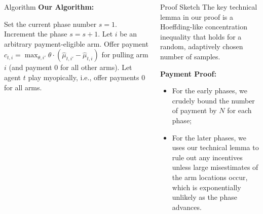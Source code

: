 \documentclass[final]{beamer} %
\begin{document}
\begin{frame}[t]
\begin{columns}[t]
\begin{column}{0.28\paperwidth}
\begin{block}{Algorithm}
\vspace{0.5cm}
\textbf{Our Algorithm:}
\vspace{0.5cm}

\begin{algorithmic}
\STATE Set the current phase number $s = 1$.
 {
\STATE Increment the phase $s = s + 1$.
\ENDIF
{} 
    \STATE Let $i$ be an arbitrary payment-eligible arm.
    \STATE Offer payment $c_{t,i} = \max_{\theta,i'} \theta \cdot (\hat{\mu}_{t,i'} - \hat{\mu}_{t,i})$ for pulling arm $i$ (and payment 0 for all other arms).
\ELSE
    \STATE Let agent $t$ play myopically, i.e., offer payments 0 for all arms.
\ENDIF 
}\ENDFOR
\end{algorithmic}

\end{block}


\end{column}



\begin{column}{0.28\paperwidth}


\begin{block}{Proof Sketch}
The key technical lemma in our proof is a Hoeffding-like concentration inequality that holds for a random, adaptively chosen number of samples.

\vspace{1cm}

\textbf{Payment Proof:}
\begin{itemize}[label=\textbullet]
\item For the early phases, we crudely bound the number of payment by $N$ for each phase;
\item For the later phases, we uses our technical lemma to rule out any incentives unless large misestimates of the arm locations occur, which is exponentially unlikely as the phase advances.
\end{itemize}

\vspace{1cm}


\end{block}
\end{column}
\end{columns}
\end{frame}
\end{document}

